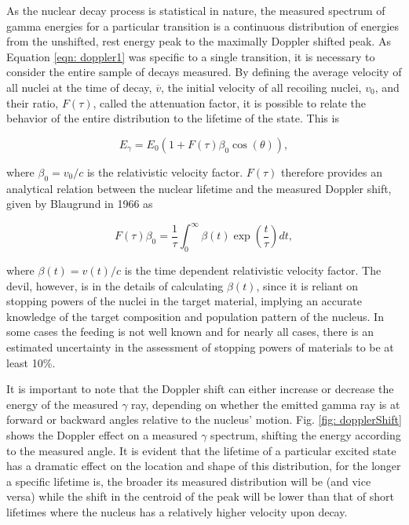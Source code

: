 As the nuclear decay process is statistical in nature, the measured spectrum of gamma energies for a particular transition is a continuous distribution of energies from the unshifted, rest energy peak to the maximally Doppler shifted peak. As Equation \ref{eqn: doppler1} was specific to a single transition, it is necessary to consider the entire sample of decays measured. By defining the average velocity of all nuclei at the time of decay, $\overline{v}$, the initial velocity of all recoiling nuclei, $v_{0}$, and their ratio, $F(\tau)$, called the attenuation factor, it is possible to relate the behavior of the entire distribution to the lifetime of the state. This is 

\begin{equation}
E_{\gamma} = E_{0} \left(1 + F(\tau) \beta_{0} \cos (\theta)   \right),
\label{eqn: dopplerFull}
\end{equation}

\noindent where $\beta_{0} = v_{0}/c$ is the relativistic velocity factor. $F(\tau)$ therefore provides an analytical relation between the nuclear lifetime and the measured Doppler shift, given by Blaugrund in 1966 \cite{Blaugrund1966} as

\begin{equation}
F(\tau) \beta_{0} = \dfrac{1}{\tau} \int_{0}^{\infty} \beta(t) \exp \left( \dfrac{t}{\tau} \right) dt,
\end{equation} 

\noindent where $\beta(t) = v(t)/c$ is the time dependent relativistic velocity factor. The devil, however, is in the details of calculating $\beta(t)$, since it is reliant on stopping powers of the nuclei in the target material, implying an accurate knowledge of the target composition and population pattern of the nucleus. In some cases the feeding is not well known and for nearly all cases, there is an estimated uncertainty in the assessment of stopping powers of materials to be at least 10\%.

It is important to note that the Doppler shift can either increase or decrease the energy of the measured $\gamma$ ray, depending on whether the emitted gamma ray is at forward or backward angles relative to the nucleus' motion. Fig. \ref{fig: dopplerShift} shows the Doppler effect on a measured $\gamma$ spectrum, shifting the energy according to the measured angle. It is evident that the lifetime of a particular excited state has a dramatic effect on the location and shape of this distribution, for the longer a specific lifetime is, the broader its measured distribution will be (and vice versa) while the shift in the centroid of the peak will be lower than that of short lifetimes where the nucleus has a relatively higher velocity upon decay. 


